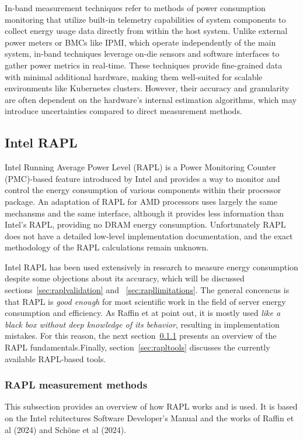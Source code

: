 In-band measurement techniques refer to methods of power consumption monitoring that utilize built-in telemetry capabilities of system components to collect energy usage data directly from within the host system. Unlike external power meters or BMCs like IPMI, which operate independently of the main system, in-band techniques leverage on-die sensors and software interfaces to gather power metrics in real-time. These techniques provide fine-grained data with minimal additional hardware, making them well-suited for scalable environments like Kubernetes clusters. However, their accuracy and granularity are often dependent on the hardware's internal estimation algorithms, which may introduce uncertainties compared to direct measurement methods.

\subsection{Intel RAPL}

Intel Running Average Power Level (RAPL) is a Power Monitoring Counter (PMC)-based feature introduced by Intel and provides a way to monitor and control the energy consumption of various components within their processor package\parencite{projectexigence_rapl}. An adaptation of RAPL for AMD processors uses largely the same mechansms and the same interface\parencite{amd_energy}, although it provides less information than Intel's RAPL, providing no DRAM energy consumption\parencite{schone2021energy}. Unfortunately RAPL does not have a detailed low-level implementation documentation, and the exact methodology of the RAPL calculations remain unknown\parencite{jay2023experimental}.

Intel RAPL has been used extensively in research to measure energy consumption\parencite{kennes2023measuring} despite some objections about its accuracy, which will be discussed sections~\ref{sec:raplvalidation} and ~\ref{sec:rapllimitations}. The general concencus is that RAPL is \textit{good enough} for most scientific work in the field of server energy consumption and efficiency. As Raffin et at\parencite{raffin2024dissecting} point out, it is mostly used \textit{like a black box without deep knowledge of its behavior}, resulting in implementation mistakes. For this reason, the next section~\ref{sec:raplmethodology} presents an overview of the RAPL fundamentals.Finally, section~\ref{sec:rapltools} discusses the currently available RAPL-based tools.

\subsubsection{RAPL measurement methods}
\label{sec:raplmethodology}
This subsection provides an overview of how RAPL works and is used. It is based on the Intel rchitectures Software Developer’s Manual\parencite[Section 16.10]{intel-sdm} and the works of Raffin et al \parencite{raffin2024dissecting} (2024) and Schöne et al \parencite{schone2024energy} (2024).


